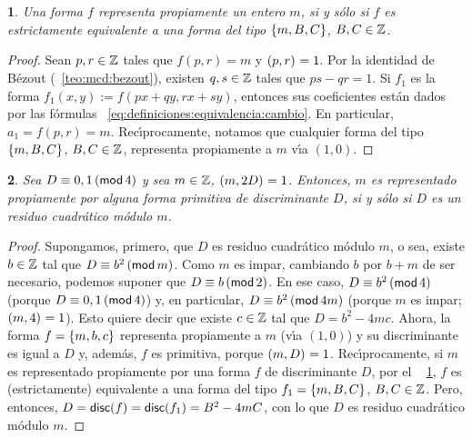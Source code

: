 \theoremstyle{plain}
\newtheorem{teoRepresentaciones}{\teoname}[section]
\newtheorem{lemaRepresentaciones}[teoRepresentaciones]{\lemaname}
\newtheorem{coroRepresentaciones}[teoRepresentaciones]{\coroname}

\theoremstyle{definition}


\begin{lemaRepresentaciones}\label{lema:representaciones:propiamente}
	Una forma $f$ representa propiamente un entero $m$, si y s\'olo
	si $f$ es estrictamente equivalente a una forma del tipo
	$\binaria{m,B,C}$, $B,C\in\Enteros$.
\end{lemaRepresentaciones}

\begin{proof}
	Sean $p,r\in\Enteros$ tales que $f(p,r)=m$ y $\mcd{p,r}=1$. Por
	la identidad de B\'ezout (\teoname~\ref{teo:mcd:bezout}), existen
	$q,s\in\Enteros$ tales que $ps-qr=1$. Si $f_1$ es la forma
	$f_1(x,y):=f(px+qy,rx+sy)$, entonces sus coeficientes est\'an
	dados por las f\'ormulas~%
	\eqref{eq:definiciones:equivalencia:cambio}. En particular,
	$a_1=f(p,r)=m$. Rec\'{\i}procamente, notamos que cualquier
	forma del tipo $\binaria{m,B,C}$, $B,C\in\Enteros$, representa
	propiamente a $m$ v\'{\i}a $(1,0)$.
\end{proof}

\begin{lemaRepresentaciones}\label{lema:representaciones:primitiva}
	Sea $D\equiv 0,1\tmodulo[4]$ y sea $m\in\Enteros$,
	$\mcd{m,2D}=1$. Entonces, $m$ es representado propiamente
	por \emph{alguna} forma primitiva de discriminante $D$,
	si y s\'olo si $D$ es un residuo cuadr\'atico m\'odulo $m$.
\end{lemaRepresentaciones}

\begin{proof}
	Supongamos, primero, que $D$ es residuo cuadr\'atico m\'odulo
	$m$, o sea, existe $b\in\Enteros$ tal que $D\equiv b^2\tmodulo[m]$.
	Como $m$ es impar, cambiando $b$ por $b+m$ de ser necesario,
	podemos suponer que $D\equiv b\tmodulo[2]$. En ese caso,
	$D\equiv b^2\tmodulo[4]$ (porque $D\equiv 0,1\tmodulo[4]$) y,
	en particular, $D\equiv b^2\tmodulo[4m]$ (porque $m$ es impar;
	$\mcd{m,4}=1$). Esto quiere decir que existe $c\in\Enteros$ tal
	que $D=b^2-4mc$. Ahora, la forma $f=\binaria{m,b,c}$ representa
	propiamente a $m$ (v\'{\i}a $(1,0)$) y su discriminante es igual a
	$D$ y, adem\'as, $f$ es primitiva, porque $\mcd{m,D}=1$.
	Rec\'{\i}procamente, si $m$ es representado propiamente por
	una forma $f$ de discriminante $D$, por el \lemaname~%
	\ref{lema:representaciones:propiamente}, $f$ es (estrictamente)
	equivalente a una forma del tipo $f_1=\binaria{m,B,C}$,
	$B,C\in\Enteros$. Pero, entonces,
	\begin{math}
		D=\discriminante(f)=\discriminante(f_1)=B^2-4mC
	\end{math},
	con lo que $D$ es residuo cuadr\'atico m\'odulo $m$.
\end{proof}

